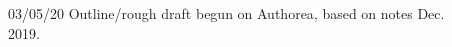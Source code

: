 \begin{description}
\item []03/05/20 Outline/rough draft begun on Authorea, based on notes Dec. 2019.
\end{description}